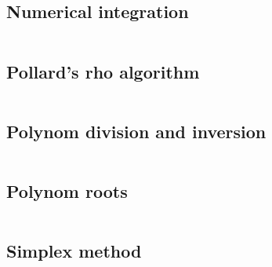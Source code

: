 \documentclass{article}
\begin{document}
\subsection{Numerical integration}
\inputminted[mathescape, breaklines, breakafter=(, tabsize=2, frame=lines, showtabs, tab=|\ , tabcolor=lightgray]{c++}{./numeric/numerical-integration/numerical-integration.cpp}
\subsection{Pollard's rho algorithm}
\inputminted[mathescape, breaklines, breakafter=(, tabsize=2, frame=lines, showtabs, tab=|\ , tabcolor=lightgray]{c++}{./numeric/pollard/pollard.cpp}
\subsection{Polynom division and inversion}
\inputminted[mathescape, breaklines, breakafter=(, tabsize=2, frame=lines, showtabs, tab=|\ , tabcolor=lightgray]{c++}{./numeric/polynom-division/polynom-division.cpp}
\subsection{Polynom roots}
\inputminted[mathescape, breaklines, breakafter=(, tabsize=2, frame=lines, showtabs, tab=|\ , tabcolor=lightgray]{c++}{./numeric/polynom-roots/polynom-roots.cpp}
\subsection{Simplex method}
\inputminted[mathescape, breaklines, breakafter=(, tabsize=2, frame=lines, showtabs, tab=|\ , tabcolor=lightgray]{c++}{./numeric/simplex/simplex.cpp}
\end{document}
